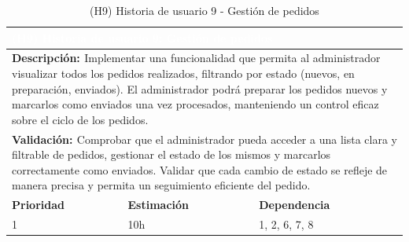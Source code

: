 \begin{table}[H]
  \centering
  \renewcommand{\arraystretch}{1.5}
  \begin{tabular}{|p{}|p{}|p{}|}
    \hline
    \multicolumn{3}{|l|}{\cellcolor{OrangeVIU}\textcolor{white}{\textbf{(H9) Historia de usuario 9: Gestión de pedidos}}} \\
    \hline
    \multicolumn{3}{|p{\dimexpr0.9\linewidth+2\tabcolsep+2\arrayrulewidth}|}{{\textbf{\textcolor{naranja}{Descripción: }}}Implementar una funcionalidad que permita al administrador visualizar todos los pedidos realizados, filtrando por estado (nuevos, en preparación, enviados). El administrador podrá preparar los pedidos nuevos y marcarlos como enviados una vez procesados, manteniendo un control eficaz sobre el ciclo de los pedidos.} \\
    \hline
    \multicolumn{3}{|p{\dimexpr0.9\linewidth+2\tabcolsep+2\arrayrulewidth}|}{{\textbf{\textcolor{naranja}{Validación: }} Comprobar que el administrador pueda acceder a una lista clara y filtrable de pedidos, gestionar el estado de los mismos y marcarlos correctamente como enviados. Validar que cada cambio de estado se refleje de manera precisa y permita un seguimiento eficiente del pedido.}} \\
    \hline
    {\textbf{\textcolor{naranja}{Prioridad }}}  & {\textbf{\textcolor{naranja}{Estimación }}}  & {\textbf{\textcolor{naranja}{Dependencia }}}  \\
    \hline
    1 &  10h &  1, 2, 6, 7, 8 \\
    \hline
  \end{tabular}
  \caption{(H9) Historia de usuario 9 - Gestión de pedidos}
  \label{table:H9}
\end{table}

